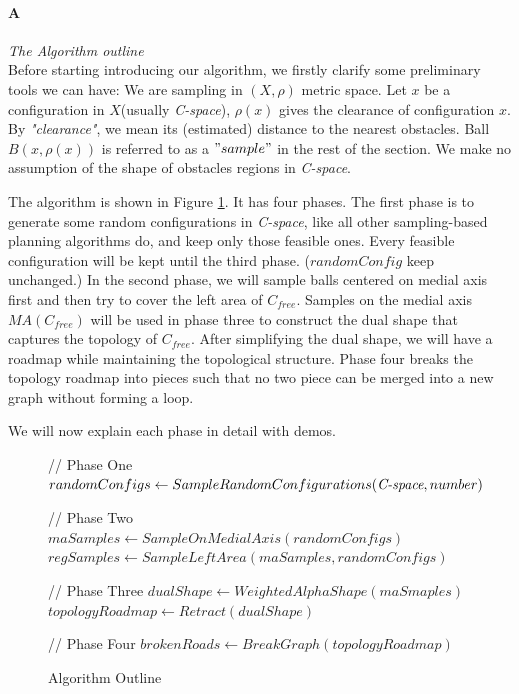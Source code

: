 \documentclass[11pt]{article}
\begin{document}
\paragraph{A} \emph{The Algorithm outline} \hfill \\
\indent Before starting introducing our algorithm, we firstly clarify some preliminary tools we can have: We are sampling in $(X, \rho)$ metric space. Let $x$ be a configuration in $X$(usually \emph{C-space}), $\rho(x)$ gives the clearance of configuration $x$. By \emph{"clearance"}, we mean its (estimated) distance to the nearest obstacles. Ball $B(x, \rho(x))$ is referred to as a $"sample"$ in the rest of the section. We make no assumption of the shape of obstacles regions in \emph{C-space}. 

\indent The algorithm is shown in Figure \ref{fig:Algo}. It has four phases. The first phase is to generate some random configurations in \emph{C-space}, like all other sampling-based planning algorithms do, and keep only those feasible ones. Every feasible configuration will be kept until the third phase. ($randomConfig$ keep unchanged.) In the second phase, we will sample balls centered on medial axis first and then try to cover the left area of $C_{free}$. Samples on the medial axis $MA(C_{free})$ will be used in phase three to construct the dual shape that captures the topology of $C_{free}$. After simplifying the dual shape, we will have a roadmap while maintaining the topological structure. Phase four breaks the topology roadmap into pieces such that no two piece can be merged into a new graph without forming a loop. 

\indent We will now explain each phase in detail with demos.

\begin{figure}
  \begin{algorithmic}[1]
  
    // Phase One
    \indent \State $randomConfigs \gets SampleRandomConfigurations( \emph{C-space}, number )$ 

    // Phase Two
    \indent \State $maSamples \gets SampleOnMedialAxis( randomConfigs )$
    \indent \State $regSamples \gets SampleLeftArea(maSamples, randomConfigs)$

    // Phase Three
    \indent \State $dualShape \gets WeightedAlphaShape( maSmaples )$
    \indent \State $topologyRoadmap \gets Retract(dualShape)$ 

    // Phase Four
    \indent \State $brokenRoads \gets BreakGraph( topologyRoadmap )$
    
    \indent 
	
  \EndFunction
  \end{algorithmic}
  \caption{\label{fig:Algo} Algorithm Outline}
\end{figure}
\end{document}
